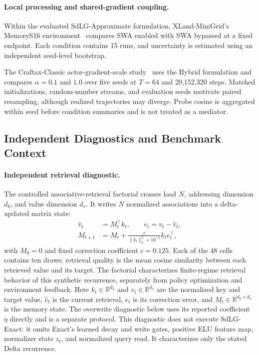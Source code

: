 \paragraph{Local processing and shared-gradient coupling.}
Within the evaluated SdLG-Approximate formulation, XLand-MiniGrid's MemoryS16 environment~\cite{minigrid,nikulin2024xland} compares SWA enabled with SWA bypassed at a fixed endpoint. Each condition contains 15 runs, and uncertainty is estimated using an independent seed-level bootstrap.

The Craftax-Classic actor-gradient-scale study~\cite{matthews2024craftax} uses the Hybrid formulation and compares $\alpha=0.1$ and $1.0$ over five seeds at $T=64$ and 20,152,320 steps. Matched initializations, random-number streams, and evaluation seeds motivate paired resampling, although realized trajectories may diverge. Probe cosine is aggregated within seed before condition summaries and is not treated as a mediator.

\subsection{Independent Diagnostics and Benchmark Context}

\paragraph{Independent retrieval diagnostic.}
The controlled associative-retrieval factorial crosses load $N$, addressing dimension $d_k$, and value dimension $d_v$. It writes $N$ normalized associations into a delta-updated matrix state:
\begin{align}
\widehat v_t&=M_t^\top k_t,\qquad e_t=v_t-\widehat v_t,\\
M_{t+1}&=M_t+\frac{c}{\lVert k_t\rVert_2^2+10^{-5}}k_te_t^\top,
\label{eq:capacity_update}
\end{align}
with $M_0=0$ and fixed correction coefficient $c=0.125$. Each of the 48 cells contains ten draws; retrieval quality is the mean cosine similarity between each retrieved value and its target. The factorial characterizes finite-regime retrieval behavior of this synthetic recurrence, separately from policy optimization and environment feedback.
Here $k_t\in\mathbb{R}^{d_k}$ and $v_t\in\mathbb{R}^{d_v}$ are the normalized key and target value, $\widehat v_t$ is the current retrieval, $e_t$ is its correction error, and $M_t\in\mathbb{R}^{d_k\times d_v}$ is the memory state. The overwrite diagnostic below uses its reported coefficient $\eta$ directly and is a separate protocol.
This diagnostic does not execute SdLG-Exact: it omits Exact's learned decay and write gates, positive ELU feature map, normalizer state $z_t$, and normalized query read. It characterizes only the stated Delta recurrence.

